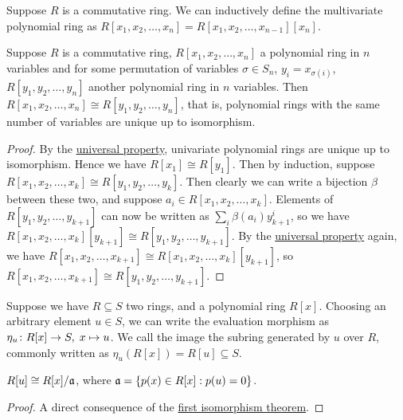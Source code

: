 \begin{definition}
    Suppose \(R\) is a commutative ring.
    We can inductively define the multivariate polynomial ring
    as \(R[x_1,x_2,\hdots,x_n] = R[x_1,x_2,\hdots,x_{n-1}][x_n]\).
\end{definition}
\begin{theorem}\label{thm:polynomial-ring-isomorphism}
    Suppose \(R\) is a commutative ring,
    \(R[x_1,x_2,\hdots,x_n]\) a polynomial ring in \(n\) variables
    and for some permutation of variables
    \(\sigma \in S_n\), \(y_i = x_{\sigma(i)}\),
    \(R[y_1,y_2,\hdots,y_n]\) another polynomial ring in \(n\) variables.
    Then \(R[x_1,x_2,\hdots,x_n] \cong R[y_1,y_2,\hdots,y_n]\),
    that is, polynomial rings with the same number of variables
    are unique up to isomorphism.
\end{theorem}
\begin{proof}
    By the \hyperref[thm:univ-prop-polynomial]{universal property},
    univariate polynomial rings are unique up to isomorphism.
    Hence we have \(R[x_1] \cong R[y_1]\).
    Then by induction,
    suppose \(R[x_1,x_2,\hdots,x_k] \cong R[y_1,y_2,\hdots,y_k]\).
    Then clearly we can write a bijection \(\beta\) between these two,
    and suppose \(a_i \in R[x_1,x_2,\hdots,x_k]\).
    Elements of \(R[y_1,y_2,\hdots,y_{k+1}]\)
    can now be written as \(\sum_i \beta(a_i) y_{k+1}^i\),
    so we have \(R[x_1,x_2,\hdots,x_k][y_{k+1}] \cong R[y_1,y_2,\hdots,y_{k+1}]\).
    By the \hyperref[thm:univ-prop-polynomial]{universal property} again, we have
    \(R[x_1,x_2,\hdots,x_{k+1}] \cong R[x_1,x_2,\hdots,x_k][y_{k+1}]\),
    so \(R[x_1,x_2,\hdots,x_{k+1}] \cong R[y_1,y_2,\hdots,y_{k+1}]\).
\end{proof}

\begin{definition}
    Suppose we have \(R \subseteq S\) two rings,
    and a polynomial ring \(R[x]\).
    Choosing an arbitrary element \(u \in S\),
    we can write the evaluation morphism as
    \(\eta_u\colon R[x]\to S,\;x\mapsto u\).
    We call the image the subring generated by \(u\) over \(R\),
    commonly written as \(\eta_u(R[x]) = R[u] \subseteq S\).
\end{definition}
\begin{proposition}
    \(R[u] \cong R[x]/\mathfrak{a}\), where \(\mathfrak{a} = \{p(x) \in R[x] : p(u) = 0\}\).
\end{proposition}
\begin{proof}
    A direct consequence of
    the \hyperref[thm:iso-1-ring]{first isomorphism theorem}.
\end{proof}

